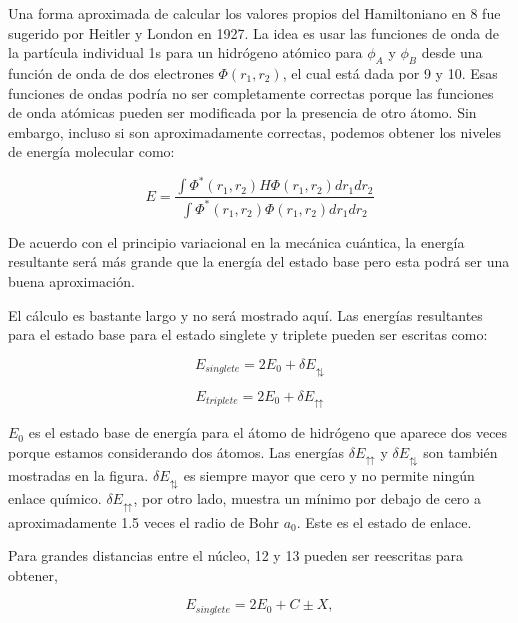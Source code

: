 \documentclass{article}
\begin{document}
Una forma aproximada de calcular los valores propios del Hamiltoniano en 8 fue sugerido por Heitler y London en 1927. La idea es usar las funciones de onda de la partícula individual 1s para un hidrógeno atómico para $\phi_{A}$ y $\phi_{B}$ desde una función de onda de dos electrones $\Phi(r_{1}, r_{2})$, el cual está dada por 9 y 10. Esas funciones de ondas podría no ser completamente correctas porque las funciones de onda atómicas pueden ser modificada por la presencia de otro átomo. Sin embargo, incluso si son aproximadamente correctas, podemos obtener los niveles de energía molecular como:

\begin{equation}
    E = \frac{\int \Phi^{*}(r_{1}, r_{2}) H \Phi(r_{1}, r_{2}) dr_{1}dr_{2}}{\int \Phi^{*}(r_{1}, r_{2})\Phi(r_{1}, r_{2}) dr_{1}dr_{2}}
\end{equation}{}

De acuerdo con el principio variacional en la mecánica cuántica, la energía resultante será más grande que la energía del estado base pero esta podrá ser una buena aproximación.

El cálculo es bastante largo  y no será mostrado aquí. Las energías resultantes para el estado base para el estado singlete y triplete pueden ser escritas como:

\begin{equation}
    E_{singlete} = 2E_{0} + \delta E_{\updownarrows}
\end{equation}

\begin{equation}
    E_{triplete} = 2E_{0} + \delta E_{\upuparrows}
\end{equation}

$E_{0}$ es el estado base de energía para el átomo de hidrógeno que aparece dos veces porque estamos considerando dos átomos. Las energías $\delta E_{\upuparrows}$ y $\delta E_{\updownarrows}$ son también mostradas en la figura. $\delta E_{\updownarrows}$ es siempre mayor que cero y no permite ningún enlace químico. $\delta E_{\upuparrows}$, por otro lado, muestra un mínimo por debajo de cero a aproximadamente 1.5 veces el radio de Bohr $a_{0}$. Este es el estado de enlace.

Para grandes distancias entre el núcleo, 12 y 13 pueden ser reescritas para obtener,

\begin{equation}
    E_{singlete} = 2E_{0} + C \pm X,
\end{equation}
\end{document}
